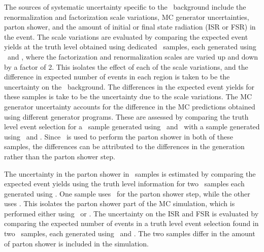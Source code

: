 The sources of systematic uncertainty specific to the \TTBAR\ background include
the renormalization and factorization scale variations, MC generator
uncertainties, parton shower, and the amount of initial or final state
radiation (ISR or FSR) in the event.
The scale variations are evaluated by comparing the expected event yields at the
truth level obtained using dedicated \TTBAR\ samples, each generated using
\powheg\ and \pythia, where the factorization and renormalization
scales are varied up and down by a factor of 2.
This isolates the effect of each of the scale variations, and the difference in
expected number of events in each region is taken to be the uncertainty on the
\TTBAR\ background.
The differences in the expected event yields for these samples is take to be
the uncertainty due to the scale variations.
The MC generator uncertainty accounts for the difference in the MC predictions
obtained using different generator programs.
These are assessed by comparing the truth level event selection for a
\TTBAR\ sample generated using \powheg\ and \jimmy\ with a sample
generated using \mcnlo\ and \jimmy.
Since \jimmy\ is used to perform the parton shower in both of these
samples, the differences can be attributed to the differences in the
generation rather than the parton shower step.

The uncertainty in the parton shower in \TTBAR\ samples is estimated by
comparing the expected event yields using the truth level information for two
\TTBAR\ samples each generated using \powheg.
One sample uses \pythia\ for the parton shower step, while the other
uses \jimmy.
This isolates the parton shower part of the MC simulation, which is performed
either using \pythia\ or \jimmy.
The uncertainty on the ISR and FSR is evaluated by comparing the expected number
of events in a truth level event selection found in two \TTBAR\ samples, each
generated using \acermc\ and \pythia.
The two samples differ in the amount of parton shower is included in the
simulation.

